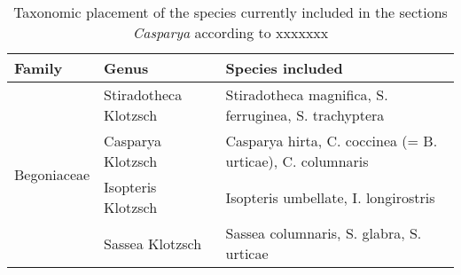 \begin{table}[]
\begin{tabular}{@{}lll@{}}
\caption{Taxonomic placement of the species currently included in the sections \textit{Casparya} according to xxxxxxx}
\toprule
Family                       & Genus                 & Species included                                          \\ \midrule
\multirow{4}{*}{Begoniaceae} & Stiradotheca Klotzsch & Stiradotheca magnifica, S. ferruginea, S. trachyptera     \\
                             & Casparya Klotzsch     & Casparya hirta, C. coccinea (= B. urticae), C. columnaris \\
                             & Isopteris Klotzsch    & Isopteris umbellate, I. longirostris                      \\
                             & Sassea Klotzsch       & Sassea columnaris, S. glabra, S. urticae                  \\ \cmidrule(l){2-3} 
\end{tabular}
\end{table}